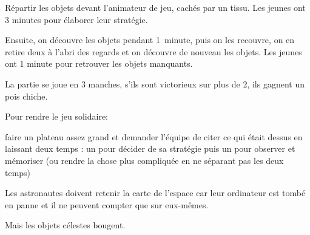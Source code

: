 \documentclass{grand-jeu}
\begin{document}
\begin{liste-materiel}
\end{liste-materiel}

\begin{regles}
Répartir les objets devant l’animateur de jeu, cachés par un tissu. Les jeunes ont 3 minutes pour élaborer leur stratégie.

Ensuite, on découvre les objets pendant 1 minute, puis on les recouvre, on en retire deux à l’abri des regards et on découvre de nouveau les objets. Les jeunes ont 1 minute pour retrouver les objets manquants.

La partie se joue en 3 manches, s’ils sont victorieux sur plus de 2, ils gagnent un pois chiche.

\vspace{0.2cm}

Pour rendre le jeu solidaire:

faire un plateau assez grand et demander l’équipe de citer ce qui était dessus en laissant deux temps : un pour décider de sa stratégie puis un pour observer et mémoriser (ou rendre la chose plus compliquée en ne séparant pas les deux temps) 
\end{regles}

\begin{imaginaire}
Les astronautes doivent retenir la carte de l’espace car leur ordinateur est tombé en panne et il ne peuvent compter que sur eux-mêmes.

Mais les objets célestes bougent.
\end{imaginaire}

\begin{moments-stop}
\end{moments-stop}
\end{document}
